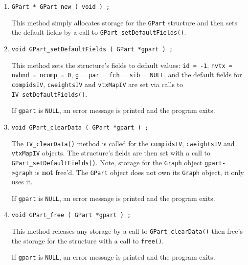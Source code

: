 \begin{enumerate}
\item
\begin{verbatim}
GPart * GPart_new ( void ) ;
\end{verbatim}
This method simply allocates storage for the {\tt GPart} structure 
and then sets the default fields by a call to 
{\tt GPart\_setDefaultFields()}.
\item
\begin{verbatim}
void GPart_setDefaultFields ( GPart *gpart ) ;
\end{verbatim}
This method sets the structure's fields to default values:
{\tt id = -1}, {\tt nvtx = nvbnd = ncomp = 0},
{\tt g} = {\tt par} = {\tt fch} = {\tt sib} = {\tt NULL},
and the default fields for {\tt compidsIV}, {\tt cweightsIV}
and {\tt vtxMapIV} are set via calls to {\tt
IV\_setDefaultFields()}.
\par {}
If {\tt gpart} is {\tt NULL},
an error message is printed and the program exits.
\item
\begin{verbatim}
void GPart_clearData ( GPart *gpart ) ;
\end{verbatim}
The {\tt IV\_clearData()} method is called for the
{\tt compidsIV}, {\tt cweightsIV} and
{\tt vtxMapIV} objects.
The structure's fields are then set
with a call to {\tt GPart\_setDefaultFields()}.
Note, storage for the {\tt Graph} object {\tt gpart->graph} 
is {\bf not} free'd.
The {\tt GPart} object does not own its {\tt Graph} object,
it only uses it.
\par {}
If {\tt gpart} is {\tt NULL},
an error message is printed and the program exits.
\item
\begin{verbatim}
void GPart_free ( GPart *gpart ) ;
\end{verbatim}
This method releases any storage by a call to 
{\tt GPart\_clearData()} then free's the storage for the 
structure with a call to {\tt free()}.
\par {}
If {\tt gpart} is {\tt NULL},
an error message is printed and the program exits.
\end{enumerate}
\par
